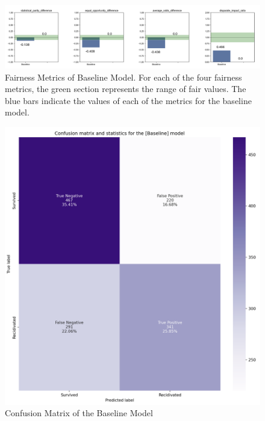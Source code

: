 \documentclass[water,article,submit,moreauthors,pdftex]{mdpi}
\begin{document}
\begin{figure}

{\centering \includegraphics[width=1\linewidth]{../images/baseline_metrics} 

}

\caption{Fairness Metrics of Baseline Model. For each of the four fairness metrics, the green section represents the range of fair values. The blue bars indicate the values of each of the metrics for the baseline model.}\label{fig:baseline metrics}
\end{figure}

\begin{figure}

{\centering \includegraphics[width=1\linewidth]{../images/baseline_matrix} 

}

\caption{Confusion Matrix of the Baseline Model}\label{fig:baseline matrix}
\end{figure}
\end{document}
